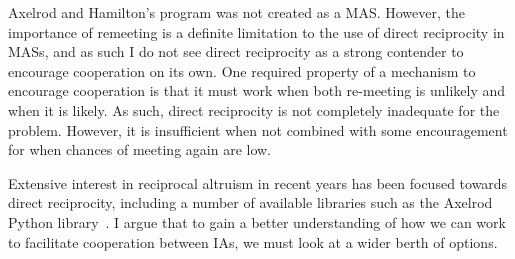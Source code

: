 \documentclass[]{final_report}
\begin{document}
Axelrod and Hamilton's program was not created as a MAS. However, the importance of remeeting is a definite limitation to the use of direct reciprocity in MASs, and as such I do not see direct reciprocity as a strong contender to encourage cooperation on its own. One required property of a mechanism to encourage cooperation is that it must work when both re-meeting is unlikely and when it is likely. As such, direct reciprocity is not completely inadequate for the problem. However, it is insufficient when not combined with some encouragement for when chances of meeting again are low.\par
Extensive interest in reciprocal altruism in recent years has been focused towards direct reciprocity, including a number of available libraries such as the Axelrod Python library~\cite{axelrodproject}. I argue that to gain a better understanding of how we can work to facilitate cooperation between IAs, we must look at a wider berth of options.
\end{document}
